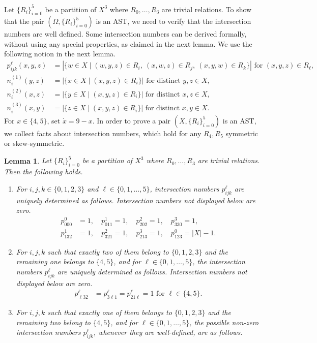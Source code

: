 \documentclass[11pt,oneside]{amsart}
\newtheorem{lemma}[theorem]{Lemma}
\begin{document}
{Let $\{R_i\}_{i=0}^5$ be a partition of $X^3$ where $R_0,\ldots,R_3$ are trivial relations.  
To show that the pair $(\Omega,\{R_i\}_{i=0}^5)$ is an AST, we need to verify that the intersection numbers are well defined. 
Some intersection numbers can be derived formally, without using any special properties, as claimed in the next lemma.
We use the following notion in the next lemma.  
\begin{align*}
p_{ijk}^\ell(x,y,z)&=|\{w\in X \mid (w,y,z)\in R_i,\ (x,w,z)\in R_j,\ (x,y,w)\in R_k\}| \text{ for } (x,y,z)\in R_\ell,\\
n_i^{(1)}(y,z)&=|\{x\in X \mid (x,y,z)\in R_i\}| \text{ for distinct } y,z\in X,\\
n_i^{(2)}(x,z)&=|\{y\in X \mid (x,y,z)\in R_i\}| \text{ for distinct } x,z\in X,\\
n_i^{(3)}(x,y)&=|\{z\in X \mid (x,y,z)\in R_i\}| \text{ for distinct } x,y\in X.
\end{align*}
For $x\in\{4,5\}$, set $\dot x=9-x$.  
In order to prove a pair $(X,\{R_i\}_{i=0}^5)$ is an AST, we collect facts about intersection numbers, which hold for any $R_4,R_5$ symmetric or skew-symmetric. 
\begin{lemma}\label{lem:intersectionnumber}%
    Let $\{R_i\}_{i=0}^5$ be a partition of $X^3$ where $R_0,\ldots,R_3$ are trivial relations.  
    Then the following holds. 
    \begin{enumerate}
        \item For $i,j,k\in\{0,1,2,3\}$ and $\ell\in\{0,1,\ldots,5\}$, intersection numbers $p_{ijk}^\ell$ are uniquely determined as follows. Intersection numbers not displayed below are zero. 
        \begin{align*}
            p_{000}^0&=1,\quad p_{011}^1=1,\quad         p_{202}^2=1,\quad p_{330}^3=1,\\         p_{132}^1&=1,\quad p_{321}^2=1,\quad p_{213}^3=1,\quad p_{123}^0=|X|-1.
        \end{align*}
        \item For $i,j,k$ such that exactly two of them belong to $\{0,1,2,3\}$ and the remaining one belongs to $\{4,5\}$, and for $\ell\in\{0,1,\ldots,5\}$, the intersection numbers $p_{ijk}^\ell$ are uniquely determined as follows. Intersection numbers not displayed below are zero. 
        \begin{align*} 
        p_{\ell32}^{\ell}&=p_{3\ell1}^{\ell}=p_{21\ell}^{\ell}=1 \text{ for } \ell\in\{4,5\}.
        \end{align*}
        \item For $i,j,k$ such that exactly one of them belongs to $\{0,1,2,3\}$ and the remaining two belong to $\{4,5\}$, and for $\ell\in\{0,1,\ldots,5\}$, the possible non-zero intersection numbers $p_{ijk}^\ell$, whenever they are well-defined, are as follows.

\end{enumerate}
\end{lemma}}
\end{document}
